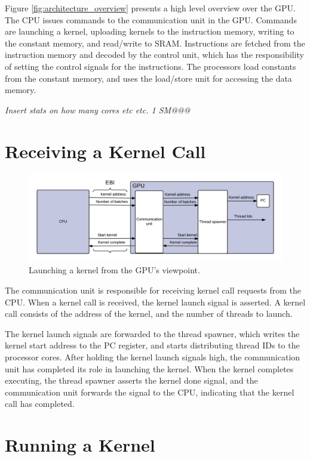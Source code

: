 \documentclass[../main/report.tex]{subfiles}
\begin{document}
Figure \ref{fig:architecture_overview} presents a high level overview over the GPU.
The CPU issues commands to the communication unit in the GPU. Commands are launching a kernel, uploading kernels to the instruction memory, writing to the constant memory, and read/write to SRAM.
Instructions are fetched from the instruction memory and decoded by the control unit, which has the responsibility of setting the control signals for the instructions.
The processors load constants from the constant memory, and uses the load/store unit for accessing the data memory.

\emph{Insert stats on how many cores etc etc. 1 SM@@@}


\section{Receiving a Kernel Call}
\begin{figure}[H]
\centering
\includegraphics[width=\textwidth]{../gpu/diagrams/receiving_a_kernel_call.png}
\caption{Launching a kernel from the GPU's viewpoint.}
\label{fig:kernel_call}
\end{figure}

The communication unit is responsible for receiving kernel call requests from the CPU.
When a kernel call is received, the kernel launch signal is asserted.
A kernel call consists of the address of the kernel, and the number of threads to launch.

The kernel launch signals are forwarded to the thread spawner, which writes the kernel start address to the PC register, and starts distributing thread IDs to the processor cores. 
After holding the kernel launch signals high, the communication unit has completed its role in launching the kernel.
When the kernel completes executing, the thread spawner asserts the kernel done signal, and the communication unit forwards the signal to the CPU, indicating that the kernel call has completed.

\section{Running a Kernel}
\end{document}
